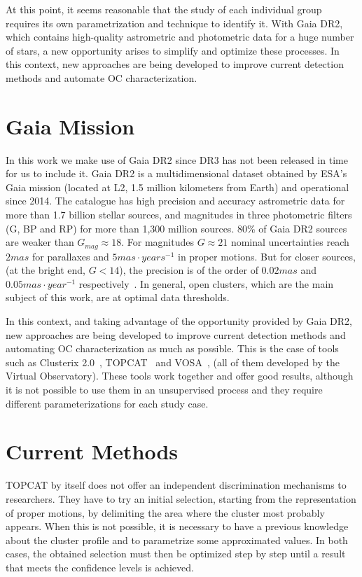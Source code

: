 \documentclass[11pt, a4paper, english]{book}
\begin{document}
At this point, it seems reasonable that the study of each individual group requires its own parametrization and technique
to identify it. With Gaia DR2, which contains high-quality astrometric and photometric data for a huge number of stars,
a new opportunity arises to simplify and optimize these processes. In this context, new approaches are being developed
to improve current detection methods and automate OC characterization.

\section{Gaia Mission}

In this work we make use of Gaia DR2 since DR3 has not been released in time for us to include it.
Gaia DR2 is a multidimensional dataset obtained by ESA's Gaia mission (located at L2, 1.5 million kilometers from Earth) and
operational since 2014. The catalogue has high precision and accuracy astrometric data for more than 1.7 billion stellar sources,
and magnitudes in three photometric filters (G, BP and RP) for more than 1,300 million sources.
80\% of Gaia DR2 sources are weaker than \(G_{mag} \approx 18\).
For magnitudes \(G \approx 21\) nominal uncertainties reach \(2 mas\) for parallaxes and \(5 mas \cdot years^{-1}\) in proper motions.
But for closer sources, (at the bright end, \(G < 14\)), the precision is of the order of \(0.02 mas\)
and \(0.05 mas \cdot year^{-1}\) respectively~\cite{cantat2018gaia}.
In general, open clusters, which are the main subject of this work, are at optimal data thresholds.

In this context, and taking advantage of the opportunity provided by Gaia DR2,
new approaches are being developed to improve current detection methods and automating OC characterization as much as possible.
This is the case of tools such as Clusterix 2.0~\cite{balaguer2020clusterix}, TOPCAT~\cite{taylor2005topcat}
and VOSA~\cite{bayo2008vosa}, (all of them developed by the Virtual Observatory).
These tools work together and offer good results,
although it is not possible to use them in an unsupervised process and they require different parameterizations for each study case.

\section{Current Methods}

TOPCAT by itself does not offer an independent discrimination mechanisms to researchers.
They have to try an initial selection, starting from the representation of proper motions,
by delimiting the area where the cluster most probably appears.
When this is not possible, it is necessary to have a previous knowledge about the cluster profile
and to parametrize some approximated values.
In both cases, the obtained selection must then be optimized step by step
until a result that meets the confidence levels is achieved.
\end{document}
